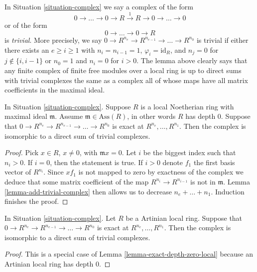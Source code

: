 \noindent
In Situation \ref{situation-complex} we say a complex of the form
$$
0 \to \ldots \to 0 \to R \xrightarrow{1} R \to 0 \to \ldots \to 0
$$
or of the form
$$
0 \to \ldots \to 0 \to R
$$
is {\it trivial}. More precisely, we say
$0 \to R^{n_e} \to R^{n_{e-1}} \to \ldots \to R^{n_0}$
is trivial if either there exists an $e \geq i \geq 1$
with $n_i = n_{i - 1} = 1$, $\varphi_i = \text{id}_R$, and
$n_j = 0$ for $j \not \in \{i, i - 1\}$ or
$n_0 = 1$ and $n_i = 0$ for $i > 0$.
The lemma above clearly says that
any finite complex of finite free modules over a local ring is up to direct
sums with trivial complexes the same as a complex
all of whose maps have all matrix coefficients in
the maximal ideal.

\begin{lemma}
\label{lemma-exact-depth-zero-local}
In Situation \ref{situation-complex}. Suppose $R$ is
a local Noetherian ring with maximal ideal $\mathfrak m$.
Assume $\mathfrak m \in \text{Ass}(R)$, in other words
$R$ has depth $0$. Suppose that
$0 \to R^{n_e} \to R^{n_{e-1}} \to \ldots \to R^{n_0}$
is exact at $R^{n_e}, \ldots, R^{n_1}$.
Then the complex is isomorphic to a direct sum of trivial
complexes.
\end{lemma}

\begin{proof}
Pick $x \in R$, $x \not = 0$, with $\mathfrak m x = 0$.
Let $i$ be the biggest index such that $n_i > 0$.
If $i = 0$, then the statement is true. If
$i > 0$ denote $f_1$ the first basis vector of $R^{n_i}$.
Since $xf_1$ is not mapped to zero by
exactness of the complex we deduce that some matrix
coefficient of the map $R^{n_i} \to R^{n_{i - 1}}$
is not in $\mathfrak m$.
Lemma \ref{lemma-add-trivial-complex} then allows
us to decrease $n_e + \ldots + n_1$. Induction finishes the proof.
\end{proof}

\begin{lemma}
\label{lemma-exact-artinian-local}
In Situation \ref{situation-complex}. Let $R$ be a Artinian local ring.
Suppose that $0 \to R^{n_e} \to R^{n_{e-1}} \to \ldots \to R^{n_0}$
is exact at $R^{n_e}, \ldots, R^{n_1}$. Then the complex is isomorphic
to a direct sum of trivial complexes.
\end{lemma}

\begin{proof}
This is a special case of Lemma \ref{lemma-exact-depth-zero-local}
because an Artinian local ring has depth $0$.
\end{proof}


